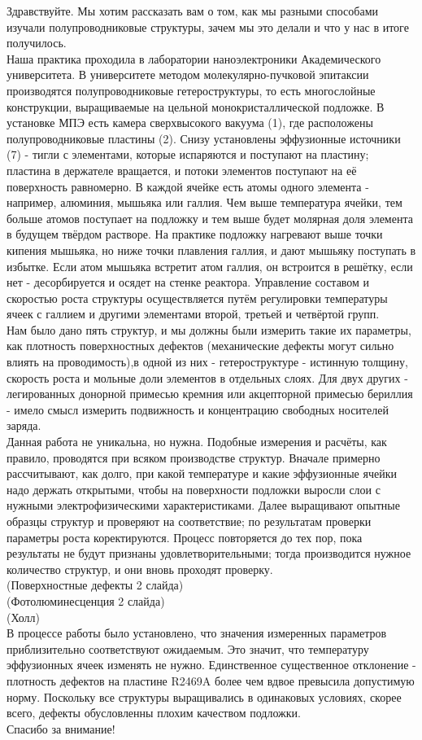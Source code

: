 \documentclass[a4paper,12pt]{article}
\begin{document}
Здравствуйте. Мы хотим рассказать вам о том, как мы разными способами изучали полупроводниковые структуры, зачем мы это делали и что у нас в итоге получилось. \\
Наша практика проходила в лаборатории наноэлектроники Академического университета. В университете методом молекулярно-пучковой эпитаксии производятся полупроводниковые гетероструктуры, то есть многослойные конструкции, выращиваемые на цельной монокристаллической подложке. В установке МПЭ есть камера сверхвысокого вакуума (1), где расположены полупроводниковые пластины (2). Снизу установлены эффузионные источники (7) - тигли с элементами, которые испаряются и поступают на пластину; пластина в держателе вращается, и потоки элементов поступают на её поверхность равномерно. В каждой ячейке есть атомы одного элемента - например, алюминия, мышьяка или галлия. Чем выше температура ячейки, тем больше атомов поступает на подложку и тем выше будет молярная доля элемента в будущем твёрдом растворе. На практике подложку нагревают выше точки кипения мышьяка, но ниже точки плавления галлия, и дают мышьяку поступать в избытке. Если атом мышьяка встретит атом галлия, он встроится в решётку, если нет - десорбируется и осядет на стенке реактора. Управление составом и скоростью роста структуры осуществляется путём регулировки температуры ячеек с галлием и другими элементами второй, третьей и четвёртой групп.\\ 
Нам было дано пять структур, и мы должны были измерить такие их параметры, как плотность поверхностных дефектов (механические дефекты могут сильно влиять на проводимость),в одной из них - гетероструктуре - истинную толщину, скорость роста и мольные доли элементов в отдельных слоях. Для двух других - легированных донорной примесью  кремния или акцепторной примесью бериллия - имело смысл измерить подвижность и концентрацию свободных носителей заряда.\\
Данная работа не уникальна, но нужна. Подобные измерения и расчёты, как правило, проводятся при всяком производстве структур. Вначале примерно рассчитывают, как долго, при какой температуре и какие эффузионные ячейки надо держать открытыми, чтобы на поверхности подложки выросли слои с нужными электрофизическими характеристиками. Далее выращивают опытные образцы структур и проверяют на соответствие; по результатам проверки параметры роста коректируются. Процесс повторяется до тех пор, пока результаты не будут признаны удовлетворительными; тогда производится нужное количество структур, и они вновь проходят проверку.\\ 
(Поверхностные дефекты 2 слайда)\\
(Фотолюминесценция 2 слайда)\\
(Холл)\\
В процессе работы было установлено, что значения измеренных параметров приблизительно соответствуют ожидаемым. Это значит, что температуру эффузионных ячеек изменять не нужно. Единственное существенное отклонение - плотность дефектов на пластине R2469A более чем вдвое превысила допустимую норму. Поскольку все структуры выращивались в одинаковых условиях, скорее всего, дефекты обусловленны плохим качеством подложки.\\
Спасибо за внимание!\\
\end{document}
